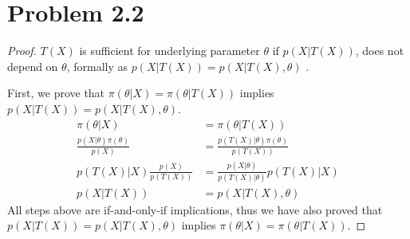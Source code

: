 \section{Problem 2.2}
\begin{proof}
$T(X)$ is sufficient for underlying parameter $\theta$ if $p(X \vert T(X))$, does not depend on $\theta$, formally as $p(X \vert T(X)) = p(X \vert T(X), \theta)$ \citep{wiki:Sufficient_statistic}.

First, we prove that $\pi(\theta \vert X) = \pi(\theta \vert T(X))$ implies $p(X \vert T(X)) = p(X \vert T(X), \theta)$.
\begin{align*}
    \pi(\theta \vert X )  &= \pi(\theta \vert T(X))\\
    \frac{p(X \vert \theta) \pi(\theta)}{p(X)} &= \frac{p(T(X) \vert \theta) \pi(\theta)}{ p(T(X))}\\
    p(T(X) \vert X) \frac{p(X)}{p(T(X))} &=  \frac{p(X \vert \theta) }{p(T(X) \vert \theta) } p(T(X) \vert X)\\
    p(X \vert T(X)) &= p(X \vert T(X), \theta)
\end{align*}
All steps above are if-and-only-if implications, thus we have also proved that $p(X \vert T(X)) = p(X \vert T(X), \theta)$ implies $\pi(\theta \vert X) = \pi(\theta \vert T(X))$.
\end{proof}